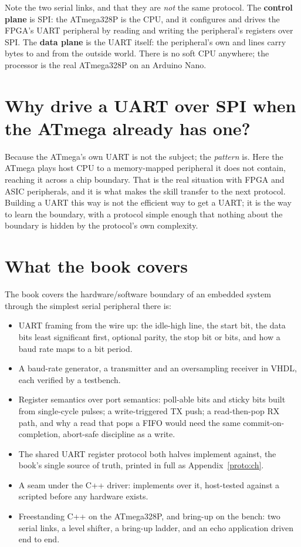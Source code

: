 Note the two serial links, and that they are \emph{not} the same protocol. The \textbf{control
plane} is SPI: the ATmega328P is the CPU, and it configures and drives the FPGA's UART peripheral
by reading and writing the peripheral's registers over SPI. The \textbf{data plane} is the UART
itself: the peripheral's own  and  lines carry bytes to and from the outside
world. There is no soft CPU anywhere; the processor is the real ATmega328P on an Arduino Nano.

\section*{Why drive a UART over SPI when the ATmega already has one?}
Because the ATmega's own UART is not the subject; the \emph{pattern} is. Here the ATmega plays host
CPU to a memory-mapped peripheral it does not contain, reaching it across a chip boundary. That is
the real situation with FPGA and ASIC peripherals, and it is what makes the skill transfer to the
next protocol. Building a UART this way is not the efficient way to get a UART; it is the way to
learn the boundary, with a protocol simple enough that nothing about the boundary is hidden by the
protocol's own complexity.

\section*{What the book covers}
The book covers the hardware/software boundary of an embedded system through the simplest serial
peripheral there is:
\begin{itemize}
  \item UART framing from the wire up: the idle-high line, the start bit, the data bits least
    significant first, optional parity, the stop bit or bits, and how a baud rate maps to a bit
    period.
  \item A baud-rate generator, a transmitter and an oversampling receiver in VHDL, each verified by
    a testbench.
  \item Register semantics over port semantics: poll-able  bits and sticky
     bits built from single-cycle pulses; a write-triggered TX push; a read-then-pop
    RX path, and why a read that pops a FIFO would need the same commit-on-completion, abort-safe
    discipline as a write.
  \item The shared UART register protocol both halves implement against, the book's single source
    of truth, printed in full as Appendix~\ref{proto:ch}.
  \item A  seam under the C++ driver: 
    implements  over it, host-tested against a scripted
     before any hardware exists.
  \item Freestanding C++ on the ATmega328P, and bring-up on the bench: two serial links, a level
    shifter, a bring-up ladder, and an echo application driven end to end.
\end{itemize}

